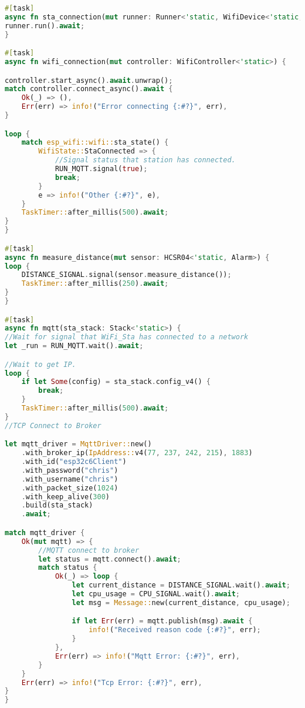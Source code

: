 \begin{lstlisting}[language=Rust]
#[task]
async fn sta_connection(mut runner: Runner<'static, WifiDevice<'static, WifiStaDevice>>) {
runner.run().await;
}

#[task]
async fn wifi_connection(mut controller: WifiController<'static>) {

controller.start_async().await.unwrap();
match controller.connect_async().await {
    Ok(_) => (),
    Err(err) => info!("Error connecting {:#?}", err),
}

loop {
    match esp_wifi::wifi::sta_state() {
        WifiState::StaConnected => {
            //Signal status that station has connected.
            RUN_MQTT.signal(true);
            break;
        }
        e => info!("Other {:#?}", e),
    }
    TaskTimer::after_millis(500).await;
}
}

#[task]
async fn measure_distance(mut sensor: HCSR04<'static, Alarm>) {
loop {
    DISTANCE_SIGNAL.signal(sensor.measure_distance());
    TaskTimer::after_millis(250).await;
}
}

#[task]
async fn mqtt(sta_stack: Stack<'static>) {
//Wait for signal that WiFi_Sta has connected to a network
let _run = RUN_MQTT.wait().await;

//Wait to get IP.
loop {
    if let Some(config) = sta_stack.config_v4() {
        break;
    }
    TaskTimer::after_millis(500).await;
}
//TCP Connect to Broker

let mqtt_driver = MqttDriver::new()
    .with_broker_ip(IpAddress::v4(77, 237, 242, 215), 1883)
    .with_id("esp32c6Client")
    .with_password("chris")
    .with_username("chris")
    .with_packet_size(1024)
    .with_keep_alive(300)
    .build(sta_stack)
    .await;

match mqtt_driver {
    Ok(mut mqtt) => {
        //MQTT connect to broker
        let status = mqtt.connect().await;
        match status {
            Ok(_) => loop {
                let current_distance = DISTANCE_SIGNAL.wait().await;
                let cpu_usage = CPU_SIGNAL.wait().await;
                let msg = Message::new(current_distance, cpu_usage);

                if let Err(err) = mqtt.publish(msg).await {
                    info!("Received reason code {:#?}", err);
                }
            },
            Err(err) => info!("Mqtt Error: {:#?}", err),
        }
    }
    Err(err) => info!("Tcp Error: {:#?}", err),
}
}
\end{lstlisting}

